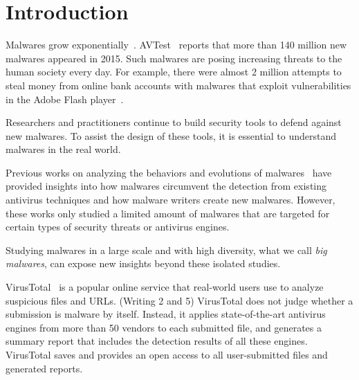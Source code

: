 \vspace{-0.1in}
\section{Introduction}

Malwares grow exponentially~\cite{avtest}. 
AVTest~\cite{avtest} reports that more than 140 million new malwares appeared in 2015. 
Such malwares are posing increasing threats to the human society every day. 
For example, there were almost 2 million attempts to 
steal money from online bank accounts 
with malwares that exploit vulnerabilities in the Adobe Flash player~\cite{kaspersky}. 

Researchers and practitioners continue to build security tools to defend against new malwares.
To assist the design of these tools, it is essential to understand malwares in the real world. 

Previous works on analyzing the behaviors and evolutions of malwares~\cite{ZhouSP2012,GuptaComsnets2009} 
have provided insights 
into how malwares circumvent the detection from existing antivirus techniques and how malware writers create new malwares. 
However, these works only studied a limited amount of malwares that are targeted for certain types of security threats or antivirus engines.

Studying malwares in a large scale and with high diversity, what we call {\em big malwares}, 
can expose new insights beyond these isolated studies.



VirusTotal~\cite{virustotal} is a popular online service that real-world users use to analyze suspicious files and URLs.
{\color{red} (Writing 2 and 5) VirusTotal does not judge whether a submission is malware by itself. Instead,
it applies state-of-the-art antivirus engines from more than 50 vendors to each submitted file, 
and generates a summary report that includes the detection results of all these engines.} 
VirusTotal saves and provides an open access to all user-submitted files and generated reports. 


